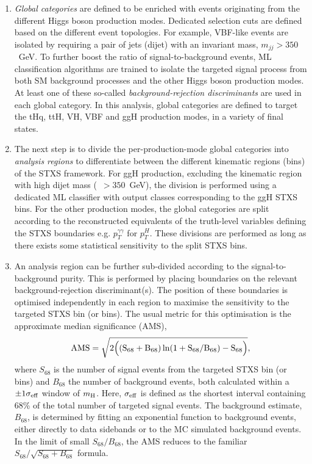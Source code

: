 \begin{enumerate}
    \item \textit{Global categories} are defined to be enriched with events originating from the different Higgs boson production modes. Dedicated selection cuts are defined based on the different event topologies. For example, VBF-like events are isolated by requiring a pair of jets (dijet) with an invariant mass, $m_{jj}>350$~GeV. To further boost the ratio of signal-to-background events, ML classification algorithms are trained to isolate the targeted signal process from both SM background processes and the other Higgs boson production modes. At least one of these so-called \textit{background-rejection discriminants} are used in each global category. In this analysis, global categories are defined to target the tHq, ttH, VH, VBF and ggH production modes, in a variety of final states.
    
    \item The next step is to divide the per-production-mode global categories into \textit{analysis regions} to differentiate between the different kinematic regions (bins) of the STXS framework. For ggH production, excluding the kinematic region with high dijet mass (\mjj~$>350$~GeV), the division is performed using a dedicated ML classifier with output classes corresponding to the ggH STXS bins. For the other production modes, the global categories are split according to the reconstructed equivalents of the truth-level variables defining the STXS boundaries e.g. $p_T^{\gamma\gamma}$ for $p_T^H$. These divisions are performed as long as there exists some statistical sensitivity to the split STXS bins. 
    
    \item An analysis region can be further sub-divided according to the signal-to-background purity. This is performed by placing boundaries on the relevant background-rejection discriminant(s). The position of these boundaries is optimised independently in each region to maximise the sensitivity to the targeted STXS bin (or bins). The usual metric for this optimisation is the approximate median significance (AMS),
    \begin{equation}
        \rm{AMS} = \sqrt{2\Big((S_{68}+B_{68})\ln(1+S_{68}/B_{68})-S_{68}\Big)},
    \end{equation}
    \noindent
    where $S_{68}$ is the number of signal events from the targeted STXS bin (or bins) and $B_{68}$ the number of background events, both calculated within a $\pm1\sigma_{\rm{eff}}$ window of $m_{\rm{H}}$. Here, $\sigma_{\rm{eff}}$ is defined as the shortest interval containing 68\% of the total number of targeted signal events. The background estimate, $B_{68}$, is determined by fitting an exponential function to background events, either directly to data sidebands or to the MC simulated background events. In the limit of small $S_{68}/B_{68}$, the AMS reduces to the familiar $S_{68}/\sqrt{S_{68}+B_{68}}$ formula.
    

\end{enumerate}
